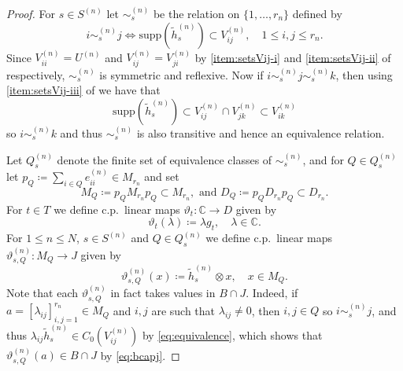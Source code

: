 \documentclass[11pt,a4paper]{amsart}
\theoremstyle{definition}
\numberwithin{equation}{section}
\newcommand{\bb}[1]{\mathbb{#1}}
\def\supp{\mathrm{supp}}
\begin{document}
\begin{proof}
For $s\in S^{(n)}$ let $\sim_s^{(n)}$ be the relation on $\{1,\dots,r_n\}$ defined by
\begin{equation}\label{eq:equivalence}
i\sim_s^{(n)}j\iff \supp(\tilde{h}_s^{(n)})\subset V_{ij}^{(n)},\quad 1\le i,j\le r_n.
\end{equation}
Since $V_{ii}^{(n)}=U^{(n)}$ and $V_{ij}^{(n)}=V_{ji}^{(n)}$ by \ref{item:setsVij-i} and \ref{item:setsVij-ii} of  respectively, $\sim_s^{(n)}$ is symmetric and reflexive. Now if $i\sim_s^{(n)}j\sim_s^{(n)}k$, then using \ref{item:setsVij-iii} of  we have that
\begin{equation}
\supp(\tilde{h}_s^{(n)})\subset V_{ij}^{(n)}\cap V_{jk}^{(n)}\subset V_{ik}^{(n)}
\end{equation}
so $i\sim_s^{(n)}k$ and thus $\sim_s^{(n)}$ is also transitive and hence an equivalence relation.

Let $Q_s^{(n)}$ denote the finite set of equivalence classes of $\sim_s^{(n)}$, and for $Q\in Q_s^{(n)}$ let $p_Q\coloneqq\sum_{i\in Q}e_{ii}^{(n)}\in M_{r_n}$ and set
\begin{equation}\label{eq:M_Q}
M_Q\coloneqq p_QM_{r_n}p_Q\subset M_{r_n}, \text{ and } D_Q\coloneqq p_QD_{r_n}p_Q\subset D_{r_n}.
\end{equation}
For $t\in T$ we define c.p.\ linear maps $\vartheta_t\colon\bb{C}\to D$ given by
\begin{equation}\label{eq:theta-t}
\vartheta_t(\lambda)\coloneqq \lambda g_t,\quad \lambda\in\bb{C}.
\end{equation}
For $1\le n\le N$, $s\in S^{(n)}$ and $Q\in Q_s^{(n)}$ we define c.p.\ linear maps $ \vartheta_{s,Q}^{(n)}\colon M_Q\to J$ given by
\begin{equation}\label{eq:theta-s-q-n}
\vartheta_{s,Q}^{(n)}(x)\coloneqq\tilde{h}_s^{(n)}\otimes x,\quad x\in M_Q.
\end{equation}
Note that each $\vartheta_{s,Q}^{(n)}$ in fact takes values in $B\cap J$. Indeed, if $a=[\lambda_{ij}]_{i,j=1}^{r_n}\in M_Q$ and $i,j$ are such that $\lambda_{ij}\ne0$, then $i,j\in Q$ so $i\sim_s^{(n)}j$, and thus $\lambda_{ij}\tilde{h}_s^{(n)}\in C_0(V_{ij}^{(n)})$ by \eqref{eq:equivalence}, which shows that $\vartheta_{s,Q}^{(n)}(a)\in B\cap J$ by \eqref{eq:bcapj}.


\end{proof}
\end{document}
